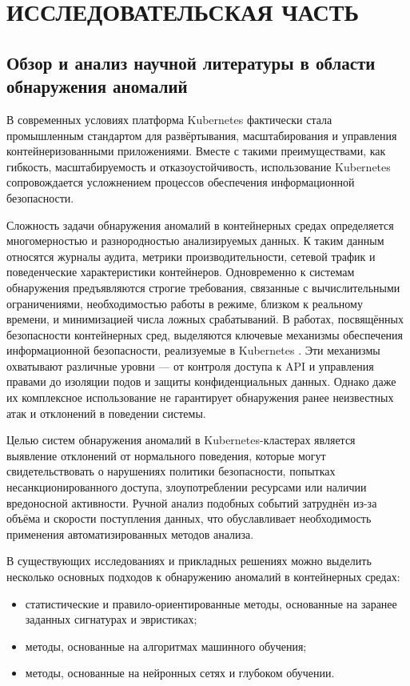 \section{ИССЛЕДОВАТЕЛЬСКАЯ ЧАСТЬ}

\subsection{Обзор и анализ научной литературы в области обнаружения аномалий}

В современных условиях платформа Kubernetes фактически стала промышленным стандартом для развёртывания, масштабирования и управления контейнеризованными приложениями. Вместе с такими преимуществами, как гибкость, масштабируемость и отказоустойчивость, использование Kubernetes сопровождается усложнением процессов обеспечения информационной безопасности.

Сложность задачи обнаружения аномалий в контейнерных средах определяется многомерностью и разнородностью анализируемых данных. К таким данным относятся журналы аудита, метрики производительности, сетевой трафик и поведенческие характеристики контейнеров. Одновременно к системам обнаружения предъявляются строгие требования, связанные с вычислительными ограничениями, необходимостью работы в режиме, близком к реальному времени, и минимизацией числа ложных срабатываний. В работах, посвящённых безопасности контейнерных сред, выделяются ключевые механизмы обеспечения информационной безопасности, реализуемые в Kubernetes \cite{Container_Security_Extensive_Roadmap}. Эти механизмы охватывают различные уровни — от контроля доступа к API и управления правами до изоляции подов и защиты конфиденциальных данных. Однако даже их комплексное использование не гарантирует обнаружения ранее неизвестных атак и отклонений в поведении системы.

Целью систем обнаружения аномалий в Kubernetes-кластерах является выявление отклонений от нормального поведения, которые могут свидетельствовать о нарушениях политики безопасности, попытках несанкционированного доступа, злоупотреблении ресурсами или наличии вредоносной активности. Ручной анализ подобных событий затруднён из-за объёма и скорости поступления данных, что обуславливает необходимость применения автоматизированных методов анализа.

В существующих исследованиях и прикладных решениях можно выделить несколько основных подходов к обнаружению аномалий в контейнерных средах:

\begin{itemize}
    \item статистические и правило-ориентированные методы, основанные на заранее заданных сигнатурах и эвристиках;
    \item методы, основанные на алгоритмах машинного обучения;
    \item методы, основанные на нейронных сетях и глубоком обучении.
\end{itemize}

